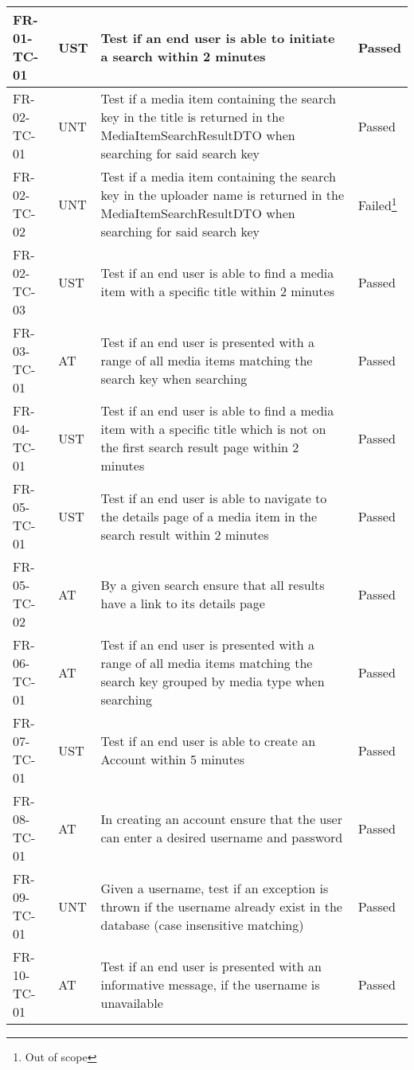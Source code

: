 \documentclass[../report.tex]{subfiles}
\begin{document}
\begin{longtable}{|L{2.1cm}|L{0.8cm}|L{9cm}|L{1.2cm}|}
FR-01-TC-01 & UST & Test if an end user is able to initiate a search within 2 minutes & Passed  \\ \hline
FR-02-TC-01& UNT& Test if a media item containing the search key in the title is returned in the MediaItemSearchResultDTO when searching for said search key& Passed  \\ \hline
FR-02-TC-02& UNT& Test if a media item containing the search key in the uploader name is returned in the MediaItemSearchResultDTO when searching for said search key& Failed\footnote{Out of scope}  \\ \hline
FR-02-TC-03&UST&Test if an end user is able to find a media item with a specific title within 2 minutes&Passed  \\ \hline
FR-03-TC-01&AT&Test if an end user is presented with a range of all media items matching the search key when searching &Passed  \\ \hline
FR-04-TC-01&UST&Test if an end user is able to find a media item with a specific title which is not on the first search result page within 2 minutes&Passed  \\ \hline
FR-05-TC-01&UST&Test if an end user is able to navigate to the details page of a media item in the search result within 2 minutes&Passed  \\ \hline
FR-05-TC-02&AT&By a given search ensure that all results have a link to its details page&Passed  \\ \hline
FR-06-TC-01&AT&Test if an end user is presented with a range of all media items matching the search key grouped by media type when searching &Passed  \\ \hline
FR-07-TC-01&UST&Test if an end user is able to create an Account within 5 minutes&Passed  \\ \hline
FR-08-TC-01&AT&In creating an account ensure that the user can enter a desired username and password&Passed  \\ \hline
FR-09-TC-01&UNT&Given a username, test if an exception is thrown if the username already exist in the database (case insensitive matching)&Passed  \\ \hline
FR-10-TC-01&AT&Test if an end user is presented with an informative message, if the username is unavailable&Passed  \\ \hline

\end{longtable}
\end{document}
